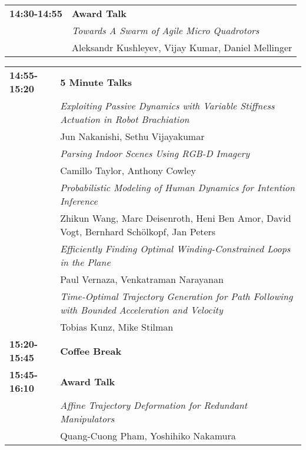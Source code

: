 \begin{tabular}{lp{13.8cm}}
{\bf 14:30-14:55} & {\bf Award Talk} \\[2mm]
& \em{ Towards A Swarm of Agile Micro Quadrotors}\\
& Aleksandr Kushleyev\label{Kushleyev}, Vijay Kumar, Daniel Mellinger\\[2mm]
\end{tabular}

\newpage
\begin{tabular}{lp{13.8cm}}
{\bf 14:55-15:20} & {\bf 5 Minute Talks} \\[2mm]
& \em{ Exploiting Passive Dynamics with Variable Stiffness Actuation in Robot Brachiation}\\
& Jun Nakanishi\label{Nakanishi}, Sethu Vijayakumar\\[2mm]
& \em{ Parsing Indoor Scenes Using RGB-D Imagery}\\
& Camillo Taylor\label{Taylor}, Anthony Cowley\\[2mm]
& \em{ Probabilistic Modeling of Human Dynamics for Intention Inference}\\
& Zhikun Wang\label{Wang}, Marc Deisenroth, Heni Ben Amor, David Vogt, Bernhard Schölkopf, Jan Peters\\[2mm]
& \em{ Efficiently Finding Optimal Winding-Constrained Loops in the Plane}\\
& Paul Vernaza\label{Vernaza}, Venkatraman Narayanan\\[2mm]
& \em{ Time-Optimal Trajectory Generation for Path Following with Bounded Acceleration and Velocity}\\
& Tobias Kunz\label{Kunz}, Mike Stilman\\[2mm]

{\bf 15:20-15:45} & {\bf Coffee Break} \\[4mm]

{\bf 15:45-16:10} & {\bf Award Talk} \\[2mm]
& \em{ Affine Trajectory Deformation for Redundant Manipulators}\\
& Quang-Cuong Pham\label{Pham}, Yoshihiko Nakamura\\[2mm]


\end{tabular}
